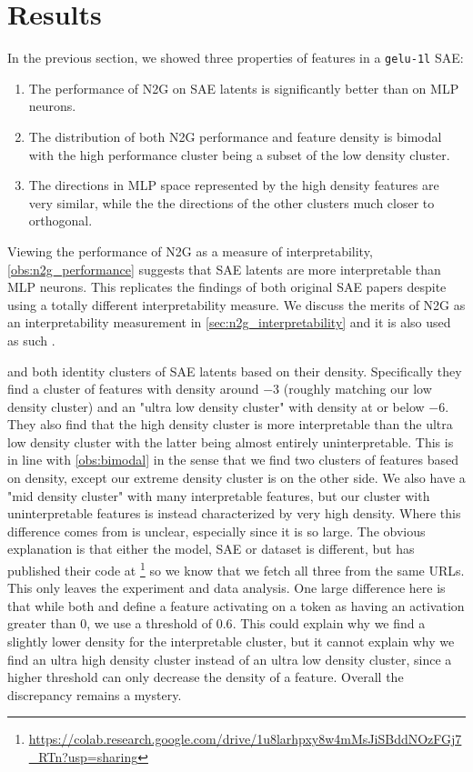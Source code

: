 \section{Results}
In the previous section, we showed three properties of features in a \texttt{gelu-1l} SAE: 
\begin{enumerate}[ref={observation~\arabic*}]
    \item The performance of N2G on SAE latents is significantly better than on MLP neurons.\label{obs:n2g_performance}
    \item The distribution of both N2G performance and feature density is bimodal with the high performance cluster being a subset of the low density cluster.\label{obs:bimodal}
    \item The directions in MLP space represented by the high density features are very similar, while the the directions of the other clusters much closer to orthogonal.\label{obs:directions}
\end{enumerate}
Viewing the performance of N2G as a measure of interpretability, \ref{obs:n2g_performance} suggests that SAE latents are more interpretable than MLP neurons.
This replicates the findings of both original SAE papers \parencite{bricken_towards_2023}\parencite{cunningham_sparse_2023} despite using a totally different interpretability measure.
We discuss the merits of N2G as an interpretability measurement in \autoref{sec:n2g_interpretability} and it is also used as such \textcite{gao_scaling_2024}.

\textcite{bricken_towards_2023} and \textcite{nanda_open_2023} both identity clusters of SAE latents based on their density.
Specifically they find a cluster of features with density around $-3$ (roughly matching our low density cluster) and an "ultra low density cluster" with density at or below $-6$.
They also find that the high density cluster is more interpretable than the ultra low density cluster with the latter being almost entirely uninterpretable.
This is in line with \ref{obs:bimodal} in the sense that we find two clusters of features based on density, except our extreme density cluster is on the other side.
We also have a "mid density cluster" with many interpretable features, but our cluster with uninterpretable features is instead characterized by very high density.
Where this difference comes from is unclear, especially since it is so large.
The obvious explanation is that either the model, SAE or dataset is different, but \textcite{nanda_open_2023} has published their code at \footnote{\url{https://colab.research.google.com/drive/1u8larhpxy8w4mMsJiSBddNOzFGj7_RTn?usp=sharing}} so we know that we fetch all three from the same URLs.
This only leaves the experiment and data analysis.
One large difference here is that while both \textcite{bricken_towards_2023} and \textcite{nanda_open_2023} define a feature activating on a token as having an activation greater than $0$, we use a threshold of $0.6$.
This could explain why we find a slightly lower density for the interpretable cluster, but it cannot explain why we find an ultra high density cluster instead of an ultra low density cluster, since a higher threshold can only decrease the density of a feature.
Overall the discrepancy remains a mystery.

